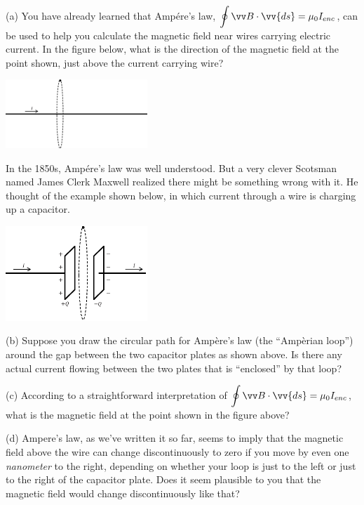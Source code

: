 (a) You have already learned that Amp\'ere's law, $\displaystyle \oint \vv B \cdot \vv{ds} = \mu_0I_{enc}$, can be used to help you calculate the magnetic field near wires carrying electric current.  In the figure below, what is the direction of the magnetic field at the point shown, just above the current carrying wire?

\begin{center}
    \includegraphics[width=0.4\textwidth]{deriving_em_waves/wire_and_loop.eps}
\end{center}

In the 1850s, Amp\'ere's law was well understood.  But a very clever Scotsman named James Clerk Maxwell realized there might be something wrong with it.  He thought of the example shown below, in which current through a wire is charging up a capacitor.
\begin{center}
    \includegraphics[width=0.4\textwidth]{deriving_em_waves/capacitor_and_loop.eps}
\end{center}

(b) Suppose you draw the circular path for Amp\`ere's law (the ``Amp\`erian loop'') around the gap between the two capacitor plates as shown above.  Is there any actual current flowing between the two plates that is ``enclosed'' by that loop?   
\vspace{0.5in}

(c) According to a straightforward interpretation of $\displaystyle \oint \vv B \cdot \vv{ds} = \mu_0I_{enc}$, what is the magnetic field at the point shown in the figure above?  
\vspace{0.4in}

(d) Ampere's law, as we've written it so far, seems to imply that the magnetic field above the wire can change discontinuously to zero if you move by even one \textit{nanometer} to the right, depending on whether your loop is just to the left or just to the right of the capacitor plate.  Does it seem plausible to you that the magnetic field would change discontinuously like that?
\vspace{0.5in}

